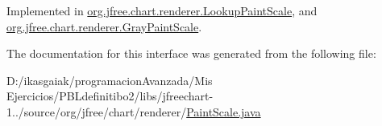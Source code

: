 Implemented in \mbox{\hyperlink{classorg_1_1jfree_1_1chart_1_1renderer_1_1_lookup_paint_scale_ad7956f5f6498550f77ce5c7ed8f22583}{org.\+jfree.\+chart.\+renderer.\+Lookup\+Paint\+Scale}}, and \mbox{\hyperlink{classorg_1_1jfree_1_1chart_1_1renderer_1_1_gray_paint_scale_a5420a928eca3df6dc07e2400ff89cab9}{org.\+jfree.\+chart.\+renderer.\+Gray\+Paint\+Scale}}.



The documentation for this interface was generated from the following file\+:\begin{DoxyCompactItemize}
\item 
D\+:/ikasgaiak/programacion\+Avanzada/\+Mis Ejercicios/\+P\+B\+Ldefinitibo2/libs/jfreechart-\/1../source/org/jfree/chart/renderer/\mbox{\hyperlink{_paint_scale_8java}{Paint\+Scale.\+java}}\end{DoxyCompactItemize}
